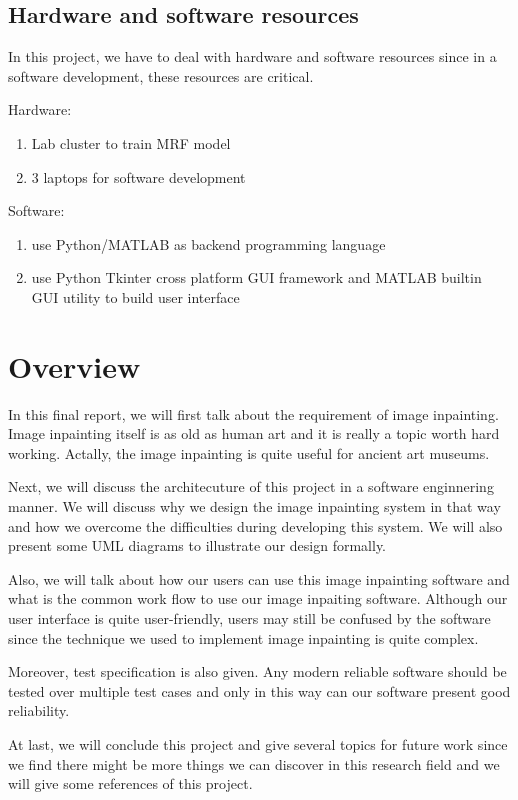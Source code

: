 \subsection{Hardware and software resources}
In this project, we have to deal with hardware and software resources since 
in a software development, these resources are critical.

Hardware:
\begin{enumerate}
\item Lab cluster to train MRF model
\item 3 laptops for software development
\end{enumerate}

Software:
\begin{enumerate}
\item use Python/MATLAB as backend programming language
\item use Python Tkinter cross platform GUI framework and MATLAB builtin
    GUI utility to build user interface
\end{enumerate}

\section{Overview}
In this final report, we will first talk about the requirement of image
inpainting. Image inpainting itself is as old as human art and it is really
a topic worth hard working. Actally, the image inpainting is quite useful
for ancient art museums.

Next, we will discuss the architecuture of this project in a software
enginnering manner. We will discuss why we design the image inpainting
system in that way and how we overcome the difficulties during developing
this system. We will also present some UML diagrams to illustrate our
design formally.

Also, we will talk about how our users can use this image inpainting 
software and what is the common work flow to use our image inpaiting
software. Although our user interface is quite user-friendly, users may
still be confused by the software since the technique we used to implement
image inpainting is quite complex.

Moreover, test specification is also given. Any modern reliable software
should be tested over multiple test cases and only in this way can our
software present  good reliability.

At last, we will conclude this project and give several topics for future
work since we find there might be more things we can discover in this
research field and we will give some references of this project.

